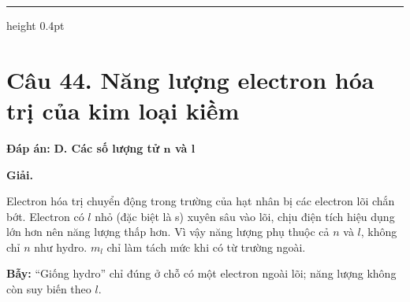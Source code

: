 \documentclass[11pt,a4paper]{article}
\renewcommand{\boldsymbol}[1]{\symbf{#1}}
\newcommand{\Cau}[2]{\par\Needspace{7\baselineskip}\section*{Câu #1. #2}}
\newcommand{\DapAn}[1]{\textbf{Đáp án:} #1\par}
\newcommand{\Bay}[1]{\par\textbf{Bẫy:} #1\par}
\newcommand{\PhanCachBai}{%
  \par\Needspace{7\baselineskip}%
  \addvspace{6pt}%
  {\color{black!40}\hrule height 0.4pt}%
  \nobreak\vspace{7pt}\nobreak
}
\begin{document}
\PhanCachBai
\Cau{44}{Năng lượng electron hóa trị của kim loại kiềm}
\DapAn{\textbf{D. Các số lượng tử $\boldsymbol{n}$ và $\boldsymbol{l}$}}

\textbf{Giải.}

Electron hóa trị chuyển động trong trường của hạt nhân bị các electron lõi chắn bớt. Electron có $l$ nhỏ (đặc biệt là s) xuyên sâu vào lõi, chịu điện tích hiệu dụng lớn hơn nên năng lượng thấp hơn. Vì vậy năng lượng phụ thuộc cả $n$ và $l$, không chỉ $n$ như hydro. $m_l$ chỉ làm tách mức khi có từ trường ngoài.
\Bay{``Giống hydro'' chỉ đúng ở chỗ có một electron ngoài lõi; năng lượng không còn suy biến theo $l$.}
\end{document}
